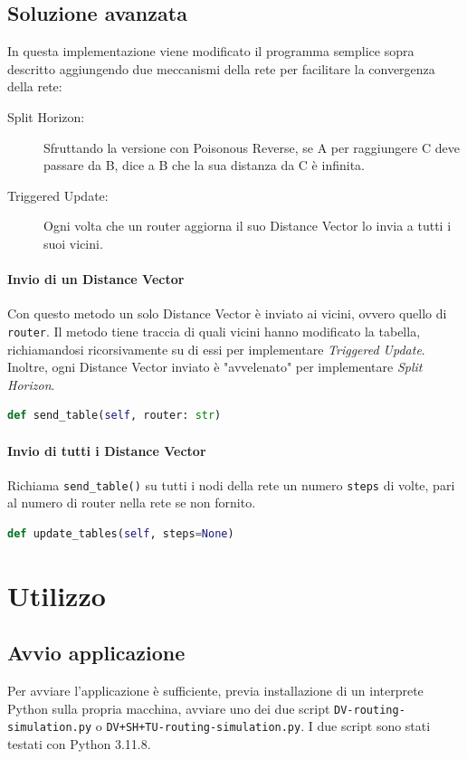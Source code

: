 \documentclass{report}
\begin{document}
\section{Soluzione avanzata}
In questa implementazione viene modificato il programma semplice sopra descritto aggiungendo due meccanismi della rete per facilitare la convergenza della rete:
\begin{description}
  \item[Split Horizon:] Sfruttando la versione con Poisonous Reverse, se A per raggiungere C deve passare da B, dice a B che la sua distanza da C è infinita.
  \item[Triggered Update:] Ogni volta che un router aggiorna il suo Distance Vector lo invia a tutti i suoi vicini.
\end{description}
\subsubsection{Invio di un Distance Vector}
Con questo metodo un solo Distance Vector è inviato ai vicini, ovvero quello di \verb|router|. Il metodo tiene traccia di quali vicini hanno modificato la tabella, richiamandosi ricorsivamente su di essi per implementare \emph{Triggered Update}. Inoltre, ogni Distance Vector inviato è "avvelenato" per implementare \emph{Split Horizon}.
\begin{lstlisting}[language=Python, caption=Invio di un Distance Vector]
def send_table(self, router: str)
\end{lstlisting}
\subsubsection{Invio di tutti i Distance Vector}
Richiama \verb|send_table()| su tutti i nodi della rete un numero \verb|steps| di volte, pari al numero di router nella rete se non fornito.
\begin{lstlisting}[language=Python, caption=Invio di tutti i Distance Vector]
def update_tables(self, steps=None)
\end{lstlisting}

\chapter{Utilizzo}
\section{Avvio applicazione}
Per avviare l'applicazione è sufficiente, previa installazione di un interprete Python sulla propria macchina, avviare uno dei due script \verb|DV-routing-simulation.py| o \verb|DV+SH+TU-routing-simulation.py|. I due script sono stati testati con Python 3.11.8.
\end{document}
